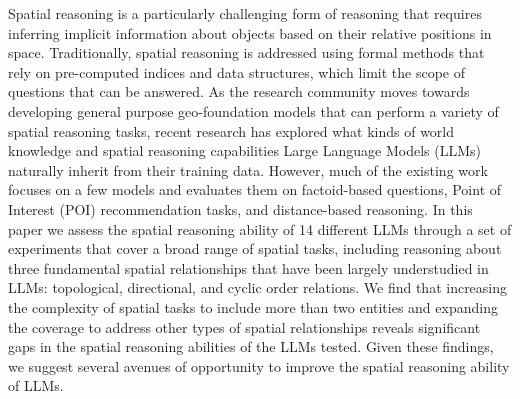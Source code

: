
Spatial reasoning is a particularly challenging form of reasoning that requires inferring implicit information about objects based on their relative positions in space.
Traditionally, spatial reasoning is addressed using formal methods that rely on pre-computed indices and data structures, which limit the scope of questions that can be answered.
As the research community moves towards developing general purpose geo-foundation models that can perform a variety of spatial reasoning tasks, recent research has explored what kinds of world knowledge and spatial reasoning capabilities Large Language Models (LLMs) naturally inherit from their training data.
However, much of the existing work focuses on a few models and evaluates them on factoid-based questions, Point of Interest (POI) recommendation tasks, and distance-based reasoning.
In this paper we assess the spatial reasoning ability of 14 different LLMs through a set of experiments that cover a broad range of spatial tasks, including reasoning about three fundamental spatial relationships that have been largely understudied in LLMs: topological, directional, and cyclic order relations.
We find that increasing the complexity of spatial tasks to include more than two entities and expanding the coverage to address other types of spatial relationships reveals significant gaps in the spatial reasoning abilities of the LLMs tested. 
Given these findings, we suggest several avenues of opportunity to improve the spatial reasoning ability of LLMs.






